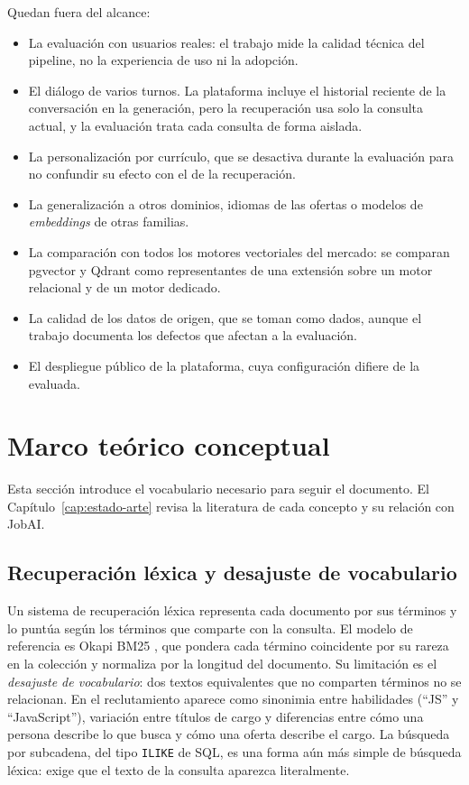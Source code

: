 Quedan fuera del alcance:
\begin{itemize}
    \item La evaluación con usuarios reales: el trabajo mide la calidad técnica del pipeline, no la experiencia de uso ni la adopción.
    \item El diálogo de varios turnos. La plataforma incluye el historial reciente de la conversación en la generación, pero la recuperación usa solo la consulta actual, y la evaluación trata cada consulta de forma aislada.
    \item La personalización por currículo, que se desactiva durante la evaluación para no confundir su efecto con el de la recuperación.
    \item La generalización a otros dominios, idiomas de las ofertas o modelos de \textit{embeddings} de otras familias.
    \item La comparación con todos los motores vectoriales del mercado: se comparan pgvector y Qdrant como representantes de una extensión sobre un motor relacional y de un motor dedicado.
    \item La calidad de los datos de origen, que se toman como dados, aunque el trabajo documenta los defectos que afectan a la evaluación.
    \item El despliegue público de la plataforma, cuya configuración difiere de la evaluada.
\end{itemize}

\section{Marco teórico conceptual}
\label{sec:marco-teorico}

Esta sección introduce el vocabulario necesario para seguir el documento. El Capítulo~\ref{cap:estado-arte} revisa la literatura de cada concepto y su relación con JobAI.

\subsection{Recuperación léxica y desajuste de vocabulario}

Un sistema de recuperación léxica representa cada documento por sus términos y lo puntúa según los términos que comparte con la consulta. El modelo de referencia es Okapi BM25 \citep{Robertson2009}, que pondera cada término coincidente por su rareza en la colección y normaliza por la longitud del documento. Su limitación es el \emph{desajuste de vocabulario}: dos textos equivalentes que no comparten términos no se relacionan. En el reclutamiento aparece como sinonimia entre habilidades (\enquote{JS} y \enquote{JavaScript}), variación entre títulos de cargo y diferencias entre cómo una persona describe lo que busca y cómo una oferta describe el cargo. La búsqueda por subcadena, del tipo \texttt{ILIKE} de SQL, es una forma aún más simple de búsqueda léxica: exige que el texto de la consulta aparezca literalmente.

